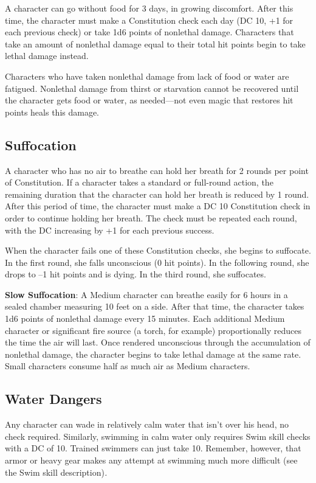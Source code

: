 A character can go without food for 3 days, in growing discomfort. After this time, the character must make a Constitution check each day (DC 10, +1 for each previous check) or take 1d6 points of nonlethal damage. Characters that take an amount of nonlethal damage equal to their total hit points begin to take lethal damage instead.
				
Characters who have taken nonlethal damage from lack of food or water are fatigued. Nonlethal damage from thirst or starvation cannot be recovered until the character gets food or water, as needed---not even magic that restores hit points heals this damage.
				
\subsection{Suffocation}

				
A character who has no air to breathe can hold her breath for 2 rounds per point of Constitution. If a character takes a standard or full-round action, the remaining duration that the character can hold her breath is reduced by 1 round. After this period of time, the character must make a DC 10 Constitution check in order to continue holding her breath. The check must be repeated each round, with the DC increasing by +1 for each previous success.
				
When the character fails one of these Constitution checks, she begins to suffocate. In the first round, she falls unconscious (0 hit points). In the following round, she drops to --1 hit points and is dying. In the third round, she suffocates.
				
\textbf{Slow Suffocation}: A Medium character can breathe easily for 6 hours in a sealed chamber measuring 10 feet on a side. After that time, the character takes 1d6 points of nonlethal damage every 15 minutes. Each additional Medium character or significant fire source (a torch, for example) proportionally reduces the time the air will last. Once rendered unconscious through the accumulation of nonlethal damage, the character begins to take lethal damage at the same rate. Small characters consume half as much air as Medium characters.
				
\subsection{Water Dangers}

				
Any character can wade in relatively calm water that isn't over his head, no check required. Similarly, swimming in calm water only requires Swim skill checks with a DC of 10. Trained swimmers can just take 10. Remember, however, that armor or heavy gear makes any attempt at swimming much more difficult (see the Swim skill description)\textit{.}
				
